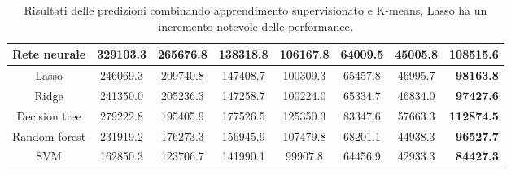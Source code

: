\documentclass{beamer}
\begin{document}
\begin{frame}
\begin{table}[ht]
\begin{tabular}{c|c|c|c|c|c|c|r|}
		\multicolumn{1}{|c|}{Rete neurale} & 329103.3 & 265676.8 & 138318.8
		& 106167.8 & 64009.5 & 45005.8 & \textbf{108515.6} \\
		\hline
		\multicolumn{1}{|c|}{Lasso} & 246069.3 & 209740.8 & 147408.7
		& 100309.3 & 65457.8 & 46995.7 & \textbf{98163.8} \\
		\hline
		\multicolumn{1}{|c|}{Ridge} & 241350.0 & 205236.3 & 147258.7
		& 100224.0 & 65334.7 & 46834.0 & \textbf{97427.6} \\
		\hline
		\multicolumn{1}{|c|}{Decision tree} & 279222.8 & 195405.9 & 177526.5
		& 125350.3 & 83347.6 & 57663.3 & \textbf{112874.5} \\
		\hline
		\multicolumn{1}{|c|}{Random forest} & 231919.2 & 176273.3 & 156945.9
		& 107479.8 & 68201.1 & 44938.3 & \textbf{96527.7} \\
		\hline
		\multicolumn{1}{|c|}{SVM} & 162850.3 & 123706.7 & 141990.1
		& 99907.8 & 64456.9 & 42933.3 & \textbf{84427.3} \\
		\hline
	\end{tabular}
	\caption{Risultati delle predizioni combinando apprendimento supervisionato
	e K-means, \alert{Lasso} ha un incremento notevole delle performance.}
\end{table}
\end{frame}
\end{document}
